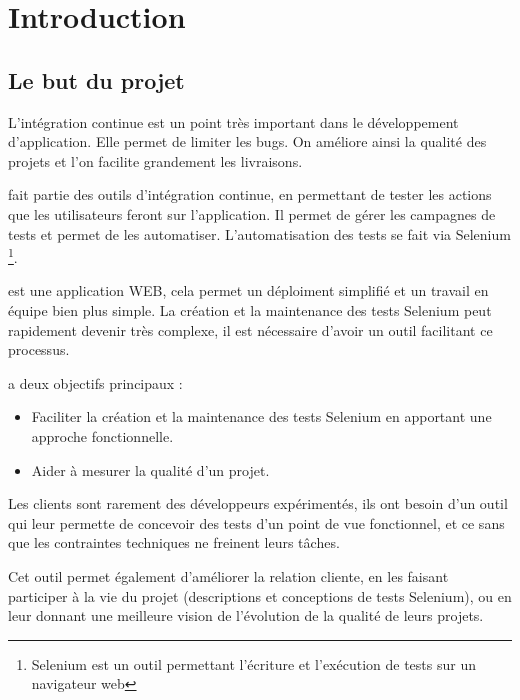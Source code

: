 \newpage{}
\chapter{Introduction}

\section{Le but du projet}

L'intégration continue est un point très important dans le développement d'application. Elle permet de limiter
les bugs. On améliore ainsi la qualité des projets et l'on facilite grandement les livraisons. 

\youTestIt{} fait partie des outils d'intégration continue, en permettant de tester les actions que les
utilisateurs feront sur l'application. Il permet de gérer les campagnes de tests et permet de les automatiser.
L'automatisation des tests se fait via Selenium \footnote{Selenium est un outil permettant l'écriture et
l’exécution de tests sur un navigateur web}. 


\youTestIt{}  est une application WEB, cela permet un déploiment simplifié et un travail en équipe bien
plus simple. La création et la maintenance des tests Selenium peut rapidement devenir très complexe,
il est nécessaire d'avoir un outil facilitant ce processus.

\youTestIt{} a deux objectifs principaux :
\begin{itemize}
	\item Faciliter la création et la maintenance des tests Selenium  en apportant une approche fonctionnelle.
	\item Aider à mesurer la qualité d'un projet.
\end{itemize}



Les clients sont rarement des développeurs expérimentés, ils ont besoin d'un outil
qui leur permette de concevoir des tests d'un point de vue fonctionnel, et ce
sans que les contraintes techniques ne freinent leurs tâches. 

Cet outil permet également d'améliorer la relation cliente, en les faisant participer
à la vie du projet (descriptions et conceptions de tests Selenium), ou en leur donnant 
une meilleure vision de l'évolution de la qualité de leurs projets. 

